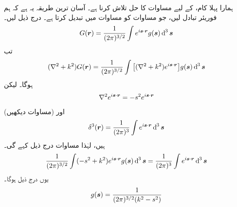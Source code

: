 ہمارا پہلا کام،  کے لیے مساوات  کا حل تلاش کرنا ہے۔ آسان ترین طریقہ یہ ہے کہ ہم فوریئر تبادل لیں، جو  مساوات کو  مساوات میں تبدیل کرتا ہے۔ درج ذیل لیں۔
\begin{align}\label{مساوات_بکھراو_مان_لیں}
	G(\kvec{r})=\frac{1}{(2\pi)^{3/2}}\int e^{i\kvec{s}\cdot \kvec{r}}g(\kvec{s})\dif^{\,3}\kvec{s}
\end{align}
تب 
\begin{align*}
	(\nabla^2+k^2)G(\kvec{r}) = \frac{1}{(2\pi)^{3/2}}\int\big[(\nabla^2+k^2)e^{i\kvec{s}\cdot \kvec{r}}\big]g(\kvec{s})\dif^{\,3}\kvec{s}
\end{align*}
ہوگا۔ لیکن
\begin{align}
	\nabla^2e^{i{{\boldsymbol{s}}}\cdot {\ensuremath{{\boldsymbol{r}}}}} = -s^2 e^{i{{\boldsymbol{s}}}\cdot {\ensuremath{{\boldsymbol{r}}}}}
\end{align}
اور (مساوات  دیکھیں)
\begin{align}
	\delta^3(\kvec{r})=\frac{1}{(2\pi)^3}\int e^{i\kvec{s}\cdot \kvec{r}}\dif^{\,3}\kvec{s}
\end{align}
ہیں، لہٰذا مساوات  درج ذیل کہے گی۔
\begin{align*}
	\frac{1}{(2\pi)^{3/2}}\int(-s^2+k^2)e^{i\kvec{s}\cdot \kvec{r}}g(\kvec{s})\dif^{\,3}\kvec{s} = \frac{1}{(2\pi)^3}\int e^{i\kvec{s}\cdot \kvec{r}}\dif^{\,3}\kvec{s}
\end{align*}
یوں درج ذیل ہوگا۔
\begin{align}
	g({{\boldsymbol{s}}}) = \frac{1}{(2\pi)^{3/2}(k^2-s^2)}
\end{align}

